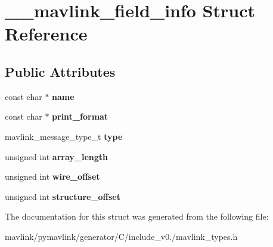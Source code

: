 \hypertarget{struct____mavlink__field__info}{}\section{\+\_\+\+\_\+mavlink\+\_\+field\+\_\+info Struct Reference}
\label{struct____mavlink__field__info}
\subsection*{Public Attributes}
\begin{DoxyCompactItemize}
\item 
\mbox{\label{struct____mavlink__field__info_ab896b0406f6fc7fc6cf55107726b4a7b}} 
const char $\ast$ {\bfseries name}
\item 
\mbox{\label{struct____mavlink__field__info_a373aca57df3879748585f472cff7e3ba}} 
const char $\ast$ {\bfseries print\+\_\+format}
\item 
\mbox{\label{struct____mavlink__field__info_a32f98e7c869ae1567c4ad366c74b6552}} 
mavlink\+\_\+message\+\_\+type\+\_\+t {\bfseries type}
\item 
\mbox{\label{struct____mavlink__field__info_aa3ab268c4176743874c8d05694ed293f}} 
unsigned int {\bfseries array\+\_\+length}
\item 
\mbox{\label{struct____mavlink__field__info_a7156648575e497f112fde78e851dd4d9}} 
unsigned int {\bfseries wire\+\_\+offset}
\item 
\mbox{\label{struct____mavlink__field__info_acb947cd22e51e70e8b5f677b543196ac}} 
unsigned int {\bfseries structure\+\_\+offset}
\end{DoxyCompactItemize}


The documentation for this struct was generated from the following file\+:\begin{DoxyCompactItemize}
\item 
mavlink/pymavlink/generator/\+C/include\+\_\+v0./mavlink\+\_\+types.\+h\end{DoxyCompactItemize}
